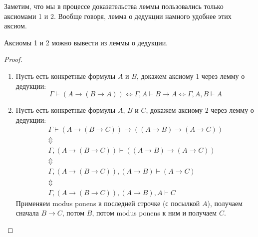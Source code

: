 Заметим, что мы в процессе доказательства леммы пользовались только аксиомами 1 и 2.
Вообще говоря, лемма о дедукции намного удобнее этих аксиом.
\begin{exmp}
	Аксиомы 1 и 2 можно вывести из леммы о дедукции.
\end{exmp}
\begin{proof}
	\begin{enumerate}
		\item
			Пусть есть конкретные формулы $A$ и $B$, докажем аксиому 1 через лемму о дедукции:
			\[ \Gamma \vdash (A \to (B \to A)) \iff \Gamma, A \vdash B \to A \iff \Gamma, A, B \vdash A\]
		\item
			Пусть есть конкретные формулы $A$, $B$ и $C$, докажем аксиому 2 через лемму о дедукции:
			\begin{gather*}
				\Gamma \vdash (A \to (B \to C)) \to ((A \to B) \to (A \to C)) \\
				\Updownarrow \\
				\Gamma, (A \to (B \to C)) \vdash ((A \to B) \to (A \to C)) \\
				\Updownarrow \\
				\Gamma, (A \to (B \to C)), (A \to B) \vdash (A \to C) \\
				\Updownarrow \\
				\Gamma, (A \to (B \to C)), (A \to B), A \vdash C
			\end{gather*}
			Применяем modus ponens в последней строчке (с посылкой $A$), получаем сначала $B \to C$, потом $B$, потом modus ponens к ним и получаем $C$.
	\end{enumerate}
\end{proof}

